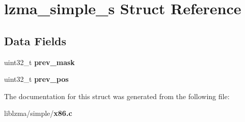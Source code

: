 \section{lzma\-\_\-simple\-\_\-s Struct Reference}
\label{structlzma__simple__s}
\subsection*{Data Fields}
\begin{DoxyCompactItemize}
\item 
uint32\-\_\-t {\bfseries prev\-\_\-mask}\label{structlzma__simple__s_a4c5b983625441becae191990954008f9}

\item 
uint32\-\_\-t {\bfseries prev\-\_\-pos}\label{structlzma__simple__s_a91234a0f09febe4efa3aafdda163e99e}

\end{DoxyCompactItemize}


The documentation for this struct was generated from the following file\-:\begin{DoxyCompactItemize}
\item 
liblzma/simple/{\bf x86.\-c}\end{DoxyCompactItemize}

